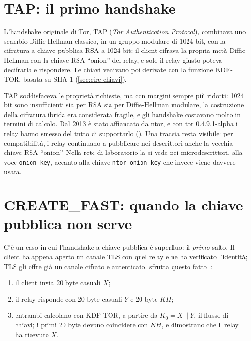 \section{TAP: il primo handshake}\label{sec:tap}

L'handshake originale di Tor, TAP (\emph{Tor Authentication Protocol}), combinava uno scambio Diffie-Hellman classico, in un gruppo modulare di 1024 bit, con la cifratura a chiave pubblica RSA a 1024 bit: il client cifrava la propria metà Diffie-Hellman con la chiave RSA \enquote{onion} del relay, e solo il relay giusto poteva decifrarla e rispondere. Le chiavi venivano poi derivate con la funzione KDF-TOR, basata su SHA-1 (\cref{sec:circ-chiavi}).

TAP soddisfaceva le proprietà richieste, ma con margini sempre più ridotti: 1024 bit sono insufficienti sia per RSA sia per Diffie-Hellman modulare, la costruzione della cifratura ibrida era considerata fragile, e gli handshake costavano molto in termini di calcolo. Dal 2013 è stato affiancato da ntor, e con tor 0.4.9.1-alpha i relay hanno smesso del tutto di supportarlo (). Una traccia resta visibile: per compatibilità, i relay continuano a pubblicare nei descrittori anche la vecchia chiave RSA \enquote{onion}. Nella rete di laboratorio la si vede nei microdescrittori, alla voce \texttt{onion-key}, accanto alla chiave \texttt{ntor-onion-key} che invece viene davvero usata.

\section{CREATE\_FAST: quando la chiave pubblica non serve}\label{sec:create-fast}

C'è un caso in cui l'handshake a chiave pubblica è superfluo: il \emph{primo} salto. Il client ha appena aperto un canale TLS con quel relay e ne ha verificato l'identità; TLS gli offre già un canale cifrato e autenticato.  sfrutta questo fatto~:
\begin{enumerate}
  \item il client invia 20 byte casuali $X$;
  \item il relay risponde con 20 byte casuali $Y$ e 20 byte $KH$;
  \item entrambi calcolano con KDF-TOR, a partire da $K_0 = X \| Y$, il flusso di chiavi; i primi 20 byte devono coincidere con $KH$, e dimostrano che il relay ha ricevuto $X$.
\end{enumerate}

